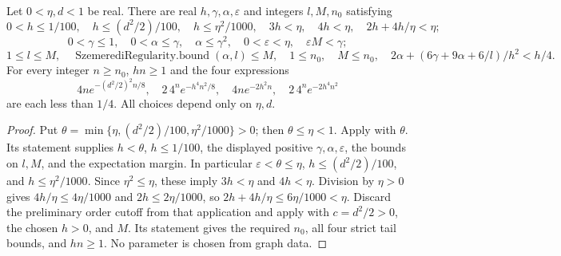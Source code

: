 \begin{lemma}
Let $0<\eta,d<1$ be real. There are real $h,\gamma,\alpha,\varepsilon$
and integers $l,M,n_0$ satisfying
\[
0<h\leq1/100,\quad h\leq(d^2/2)/100,\quad h\leq\eta^2/1000,
\quad3h<\eta,\quad4h<\eta,\quad2h+4h/\eta<\eta;
\]
\[
0<\gamma\leq1,\quad0<\alpha\leq\gamma,\quad\alpha\leq\gamma^2,
\quad0<\varepsilon<\eta,\quad\varepsilon M<\gamma;
\]
\[
1\leq l\leq M,\quad\operatorname{SzemerediRegularity.bound}(\alpha,l)\leq M,
\quad1\leq n_0,\quad M\leq n_0,
\quad2\alpha+(6\gamma+9\alpha+6/l)/h^2<h/4.
\]
For every integer $n\geq n_0$, $hn\geq1$ and the four expressions
\[
4n e^{-(d^2/2)^2n/8},\quad2\,4^n e^{-h^4n^2/8},\quad
4n e^{-2h^2n},\quad2\,4^n e^{-2h^4n^2}
\]
are each less than $1/4$. All choices depend only on $\eta,d$.
\end{lemma}
\begin{proof}
Put $\theta=\min\{\eta,(d^2/2)/100,\eta^2/1000\}>0$;
then $\theta\leq\eta<1$. Apply 
with $\theta$. Its statement supplies $h<\theta$, $h\leq1/100$,
the displayed positive $\gamma,\alpha,\varepsilon$, the bounds on
$l,M$, and the expectation margin. In particular
$\varepsilon<\theta\leq\eta$, $h\leq(d^2/2)/100$, and
$h\leq\eta^2/1000$. Since $\eta^2\leq\eta$, these imply
$3h<\eta$ and $4h<\eta$. Division by $\eta>0$ gives
$4h/\eta\leq4\eta/1000$ and $2h\leq2\eta/1000$, so
$2h+4h/\eta\leq6\eta/1000<\eta$.
Discard the preliminary order cutoff from that application and apply
 with $c=d^2/2>0$, the chosen $h>0$,
and $M$. Its statement gives the required $n_0$, all four strict tail
bounds, and $hn\geq1$. No parameter is chosen from graph data.
\end{proof}
